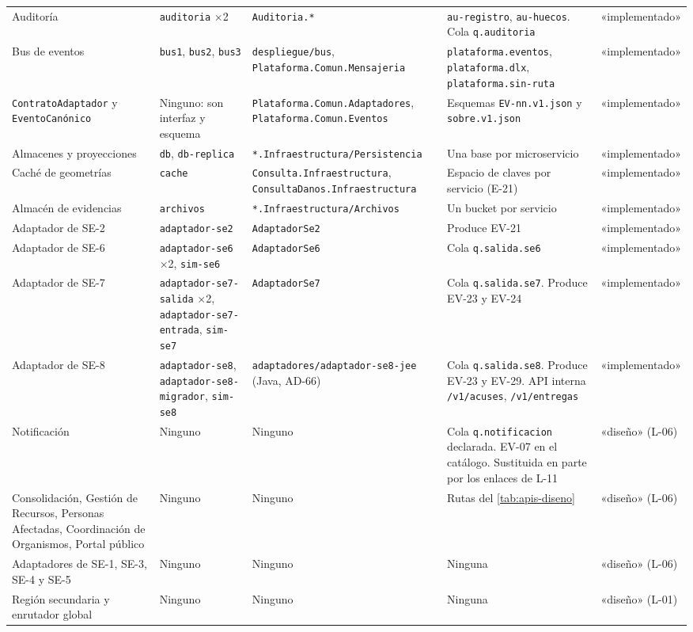 \documentclass[11pt,letterpaper]{article}
\providecommand{\br}{\discretionary{}{}{}}
\begin{document}
\begin{longtable}{L{2.4cm} L{2.8cm} L{3.6cm} L{3.7cm} L{2.6cm}}
Auditoría & \texttt{auditoria} ×2 & \texttt{Auditoria.*} & \texttt{au-registro},
\texttt{au-huecos}. Cola \texttt{q.auditoria} & «implementado» \\
Bus de eventos & \texttt{bus1}, \texttt{bus2}, \texttt{bus3} & \texttt{despliegue/\br{}bus},
\texttt{Plataforma.\br{}Comun.\br{}Mensajeria} & \texttt{plataforma.\br{}eventos}, \texttt{plataforma.\br{}dlx},
\texttt{plataforma.\br{}sin-\br{}ruta} & «implementado» \\
\texttt{Contrato\br{}Adaptador} y \texttt{Evento\br{}Canónico} & Ninguno: son interfaz y esquema &
\texttt{Plataforma.\br{}Comun.\br{}Adaptadores}, \texttt{Plataforma.\br{}Comun.\br{}Eventos} & Esquemas
\texttt{EV-nn.v1.json} y \texttt{sobre.v1.json} & «implementado» \\
Almacenes y proyecciones & \texttt{db}, \texttt{db-replica} & \texttt{*.Infraestructura/\br{}Persistencia}
& Una base por microservicio & «implementado» \\
Caché de geometrías & \texttt{cache} & \texttt{Consulta.\br{}Infraestructura},
\texttt{ConsultaDanos.\br{}Infraestructura} & Espacio de claves por servicio (E-21) & «implementado» \\
Almacén de evidencias & \texttt{archivos} & \texttt{*.\br{}Infraestructura/\br{}Archivos} & Un bucket por
servicio & «implementado» \\
Adaptador de SE-2 & \texttt{adaptador-se2} & \texttt{AdaptadorSe2} & Produce EV-21 &
«implementado» \\
Adaptador de SE-6 & \texttt{adaptador-se6} ×2, \texttt{sim-se6} & \texttt{AdaptadorSe6} & Cola
\texttt{q.salida.se6} & «implementado» \\
Adaptador de SE-7 & \texttt{adaptador-\br{}se7-\br{}salida} ×2, \texttt{adaptador-\br{}se7-\br{}entrada},
\texttt{sim-se7} & \texttt{AdaptadorSe7} & Cola \texttt{q.salida.se7}. Produce EV-23 y EV-24 &
«implementado» \\
Adaptador de SE-8 & \texttt{adaptador-se8}, \texttt{adaptador-\br{}se8-\br{}migrador}, \texttt{sim-se8}
& \texttt{adaptadores/\br{}adaptador-\br{}se8-\br{}jee} (Java, AD-66) & Cola \texttt{q.salida.se8}. Produce
EV-23 y EV-29. API interna \texttt{/v1/acuses}, \texttt{/v1/entregas} & «implementado» \\
Notificación & Ninguno & Ninguno & Cola \texttt{q.\br{}notificacion} declarada. EV-07 en el catálogo.
Sustituida en parte por los enlaces de L-11 & «diseño» (L-06) \\
Consolidación, Gestión de Recursos, Personas Afectadas, Coordinación de Organismos, Portal público
& Ninguno & Ninguno & Rutas del \cref{tab:apis-diseno} & «diseño» (L-06) \\
Adaptadores de SE-1, SE-3, SE-4 y SE-5 & Ninguno & Ninguno & Ninguna & «diseño» (L-06) \\
Región secundaria y enrutador global & Ninguno & Ninguno & Ninguna & «diseño» (L-01) \\
\end{longtable}
\endgroup
\end{document}
